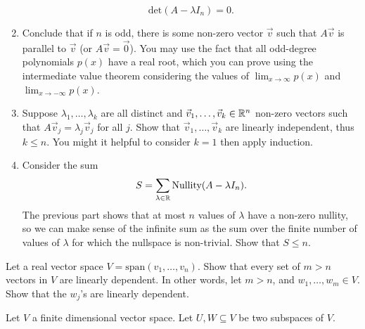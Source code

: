 \begin{exerciselist}
\begin{enumerate}[label=(\alph*)]
\[		\textrm{det}(A-\lambda I_n)=0.
		\]
		\item Conclude that if $n$ is odd, there is some non-zero vector $\vec{v}$ such that $A\vec{v}$ is parallel to $\vec{v}$ (or $A\vec{v}=\vec{0}$). You may use the fact that all odd-degree polynomials $p(x)$ have a real root, which you can prove using the intermediate value theorem considering the values of $\lim_{x\to \infty}p(x)$ and $\lim_{x\to -\infty}p(x)$. 
		\item Suppose $\lambda_1,\ldots,\lambda_k$ are all distinct and $\vec{v}_1,\ldots,\vec{v}_k\in \mathbb{R}^n$ non-zero vectors such that $A\vec{v}_j=\lambda_j\vec{v}_j$ for all $j$. Show that $\vec{v}_1,\ldots ,\vec{v}_k$ are linearly independent, thus $k\leq n$. You might it helpful to consider $k=1$ then apply induction.
		\item Consider the sum \[
		S=\sum_{\lambda\in\mathbb{R}} \textrm{Nullity}(A-\lambda I_n).
		\]
		The previous part shows that at most $n$ values of $\lambda$ have a non-zero nullity, so we can make sense of the infinite sum as the sum over the finite number of values of $\lambda$ for which the nullspace is non-trivial. Show that $S\leq n$.
	\end{enumerate}
	\item Let a real vector space $V=\textrm{span}(v_1,\ldots, v_n)$. Show that every set of $m>n$ vectors in $V$ are linearly dependent. In other words, let $m>n$, and $w_1,\ldots,w_m\in V$. Show that the $w_j$'s are linearly dependent.
	\item Let $V$ a finite dimensional vector space. Let $U,W\subseteq V$ be two subspaces of $V$. 
	\begin{enumerate}[label=(\alph*)]
		

\end{enumerate}
\end{exerciselist}
